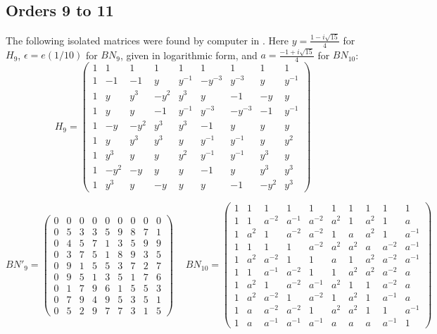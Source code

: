 \documentclass[11pt]{amsart}
\begin{document}
\subsection{Orders 9 to 11}\label{sec:nine}

The following isolated matrices were found by computer in \cite[Section 3]{ben}. Here $y=\frac{1-i\sqrt{15}}{4}$ for $H_9$, $\epsilon=e(1/10)$ for $BN_9$, given in logarithmic form, and $a=\frac{-1+i\sqrt{15}}{4}$ for $BN_{10}$:
{\small$$H_9=\begin{pmatrix}
1&1&1&1&1&1&1&1&1\\
1&-1&-1&y&y^{-1}&-y^{-3}&y^{-3}&y&y^{-1}\\
1&y&y^3&-y^2&y^3&y&-1&-y&y\\
1&y&y&-1&y^{-1}&y^{-3}&-y^{-3}&-1&y^{-1}\\
1&-y&-y^2&y^3&y^3&-1&y&y&y\\
1&y&y^3&y^3&y&y^{-1}&y^{-1}&y&y^2\\
1&y^3&y&y&y^2&y^{-1}&y^{-1}&y^3&y\\
1&-y^2&-y&y&y&-1&y&y^3&y^3\\
1&y^3&y&-y&y&y&-1&-y^2&y^3
\end{pmatrix}$$}

{\small\setlength{\arraycolsep}{2.6pt}$$BN'_9=\begin{pmatrix}0 & 0 & 0 & 0 & 0 & 0 & 0 & 0 & 0\\ 0 & 5 & 3 & 3 & 5 & 9 & 8 & 7 & 1\\ 0 & 4 & 5 & 7 & 1 & 3 & 5 & 9 & 9\\ 0 & 3 & 7 & 5 & 1 & 8 & 9 & 3 & 5\\ 0 & 9 & 1 & 5 & 5 & 3 & 7 & 2 & 7\\ 0 & 9 & 5 & 1 & 3 & 5 & 1 & 7 & 6\\ 0 & 1 & 7 & 9 & 6 & 1 & 5 & 5 & 3\\ 0 & 7 & 9 & 4 & 9 & 5 & 3 & 5 & 1\\ 0 & 5 & 2 & 9 & 7 & 7 & 3 & 1 & 5\end{pmatrix}\quad\ BN_{10}=\begin{pmatrix}
1&1&1&1&1&1&1&1&1&1\\
1&1&a^{-2}&a^{-1}&a^{-2}&a^2&1&a^2&1&a\\
1&a^2&1&a^{-2}&a^{-2}&1&a&a^2&1&a^{-1}\\
1&1&1&1&a^{-2}&a^2&a^2&a&a^{-2}&a^{-1}\\
1&a^2&a^{-2}&1&1&a&1&a^2&a^{-2}&a^{-1}\\
1&1&a^{-1}&a^{-2}&1&1&a^2&a^2&a^{-2}&a\\
1&a^2&1&a^{-2}&a^{-1}&a^2&1&1&a^{-2}&a\\
1&a^2&a^{-2}&1&a^{-2}&1&a^2&1&a^{-1}&a\\
1&a&a^{-2}&a^{-2}&1&a^2&a^2&1&1&a^{-1}\\
1&a&a^{-1}&a^{-1}&a^{-1}&a&a&a&a^{-1}&1
\end{pmatrix}$$}
\end{document}
